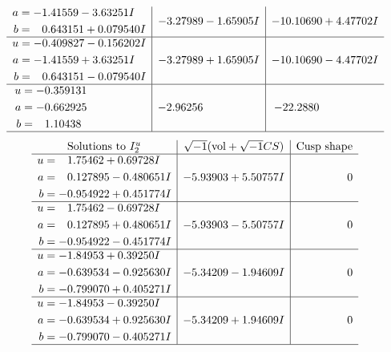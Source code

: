 \documentclass[1p]{elsarticle_modified}
\theoremstyle{definition}
\newcommand{\I}{\sqrt{-1}}
\begin{document}
$$\begin{array}{c|c|c}
\begin{aligned}
a &= -1.41559 - 3.63251 I \\
b &= \phantom{-}0.643151 + 0.079540 I\end{aligned}
 & -3.27989 - 1.65905 I & -10.10690 + 4.47702 I \\ \hline\begin{aligned}
u &= -0.409827 - 0.156202 I \\
a &= -1.41559 + 3.63251 I \\
b &= \phantom{-}0.643151 - 0.079540 I\end{aligned}
 & -3.27989 + 1.65905 I & -10.10690 - 4.47702 I \\ \hline\begin{aligned}
u &= -0.359131\phantom{ +0.000000I} \\
a &= -0.662925\phantom{ +0.000000I} \\
b &= \phantom{-}1.10438\phantom{ +0.000000I}\end{aligned}
 & -2.96256\phantom{ +0.000000I} & -22.2880\phantom{ +0.000000I}\\
 \hline 
 \end{array}$$\newpage$$\begin{array}{c|c|c}  
\text{Solutions to }I^u_{2}& \I (\text{vol} + \sqrt{-1}CS) & \text{Cusp shape}\\
 \hline 
\begin{aligned}
u &= \phantom{-}1.75462 + 0.69728 I \\
a &= \phantom{-}0.127895 - 0.480651 I \\
b &= -0.954922 + 0.451774 I\end{aligned}
 & -5.93903 + 5.50757 I & \phantom{-0.000000 } 0 \\ \hline\begin{aligned}
u &= \phantom{-}1.75462 - 0.69728 I \\
a &= \phantom{-}0.127895 + 0.480651 I \\
b &= -0.954922 - 0.451774 I\end{aligned}
 & -5.93903 - 5.50757 I & \phantom{-0.000000 } 0 \\ \hline\begin{aligned}
u &= -1.84953 + 0.39250 I \\
a &= -0.639534 - 0.925630 I \\
b &= -0.799070 + 0.405271 I\end{aligned}
 & -5.34209 - 1.94609 I & \phantom{-0.000000 } 0 \\ \hline\begin{aligned}
u &= -1.84953 - 0.39250 I \\
a &= -0.639534 + 0.925630 I \\
b &= -0.799070 - 0.405271 I\end{aligned}
 & -5.34209 + 1.94609 I & \phantom{-0.000000 } 0\\
 \hline 
 \end{array}$$\newpage
\end{document}
